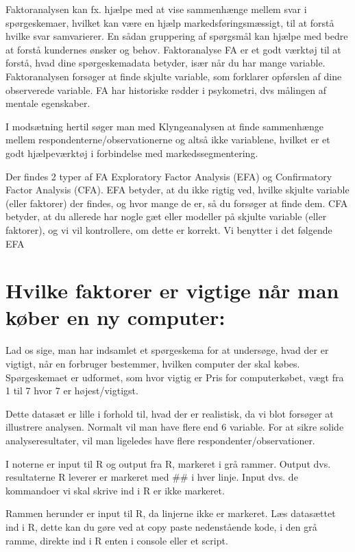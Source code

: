 \documentclass[]{book}
\begin{document}
Faktoranalysen kan fx. hjælpe med at vise sammenhænge mellem svar i spørgeskemaer, hvilket kan være en hjælp markedsføringsmæssigt, til at forstå hvilke svar samvarierer. En sådan gruppering af spørgsmål kan hjælpe med bedre at forstå kundernes ønsker og behov. Faktoranalyse FA er et godt værktøj til at forstå, hvad dine spørgeskemadata betyder, især når du har mange variable. Faktoranalysen forsøger at finde skjulte variable, som forklarer opførslen af dine observerede variable. FA har historiske rødder i psykometri, dvs målingen af mentale egenskaber.

I modsætning hertil søger man med Klyngeanalysen at finde sammenhænge mellem respondenterne/observationerne og altså ikke variablene, hvilket er et godt hjælpeværktøj i forbindelse med markedssegmentering.

Der findes 2 typer af FA Exploratory Factor Analysis (EFA) og Confirmatory Factor Analysis (CFA). EFA betyder, at du ikke rigtig ved, hvilke skjulte variable (eller faktorer) der findes, og hvor mange de er, så du forsøger at finde dem. CFA betyder, at du allerede har nogle gæt eller modeller på skjulte variable (eller faktorer), og vi vil kontrollere, om dette er korrekt. Vi benytter i det følgende EFA

\hypertarget{hvilke-faktorer-er-vigtige-nar-man-kber-en-ny-computer}{%
\section{Hvilke faktorer er vigtige når man køber en ny computer:}\label{hvilke-faktorer-er-vigtige-nar-man-kber-en-ny-computer}}

Lad os sige, man har indsamlet et spørgeskema for at undersøge, hvad der er vigtigt, når en forbruger bestemmer, hvilken computer der skal købes. Spørgeskemaet er udformet, som hvor vigtig er Pris for computerkøbet, vægt fra 1 til 7 hvor 7 er højest/vigtigst.

Dette datasæt er lille i forhold til, hvad der er realistisk, da vi blot forsøger at illustrere analysen. Normalt vil man have flere end 6 variable. For at sikre solide analyseresultater, vil man ligeledes have flere respondenter/observationer.

I noterne er input til R og output fra R, markeret i grå rammer. Output dvs. resultaterne R leverer er markeret med \#\# i hver linje. Input dvs. de kommandoer vi skal skrive ind i R er ikke markeret.

Rammen herunder er input til R, da linjerne ikke er markeret. Læs datasættet ind i R, dette kan du gøre ved at copy paste nedenstående kode, i den grå ramme, direkte ind i R enten i console eller et script.
\end{document}
